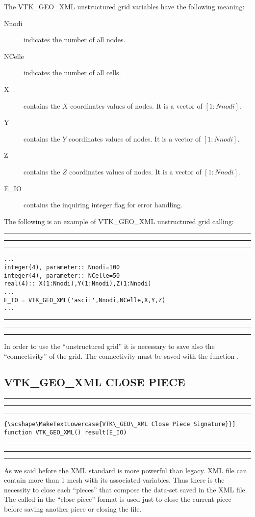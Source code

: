 \documentclass[pagesize=pdftex,fontsize=10pt,paper=a4,oneside]{scrbook}
\DeclareRobustCommand{\MarginNote}[1]{\marginpar{%
\slshape\footnotesize%
\parindent=0pt\lineskip=0pt\lineskiplimit=0pt%
\tolerance=2000\hyphenpenalty=300\exhyphenpenalty=300%
\doublehyphendemerits=100000\finalhyphendemerits=\doublehyphendemerits%
\raggedright\hspace{0pt}#1}}
\newenvironment{boxred}[1]%
               {%
                \noindent\hspace*{-0.025\textwidth}%
                \color{Maroon}%
                \rule[-5.8pt]{0.6pt}{6pt}\hspace*{-0.6pt}\rule{1.05\textwidth}{0.6pt}\hspace*{-0.6pt}\rule[-5.8pt]{0.6pt}{6pt}%
                \color{black}%
                \vspace*{0.6pt}\MarginNote{\color{Maroon}{#1}}%
               }%
               {%
                \noindent\hspace*{-0.025\textwidth}%
                \color{Maroon}%
                \rule[0pt]{0.6pt}{6pt}\hspace*{-0.6pt}\rule{1.05\textwidth}{0.6pt}\hspace*{-0.6pt}\rule[0pt]{0.6pt}{6pt}%
                \color{black}%
                \vspace*{2mm}%
               }
\newcommand{\virgo}[1]{``{#1}''}
\DeclareRobustCommand{\MaiuscolettoBS}[1]{\textls[80]{\scshape\MakeTextLowercase{#1}}}
\begin{document}
The VTK\_GEO\_XML unstructured grid variables have the following meaning:

\begin{description}
 \item[{\color{RoyalBlue}Nnodi}] indicates the number of all nodes.
 \item[{\color{RoyalBlue}NCelle}] indicates the number of all cells.
 \item[{\color{RoyalBlue}X}] contains the $X$ coordinates values of nodes. It is a vector of $[1:Nnodi]$.
 \item[{\color{RoyalBlue}Y}] contains the $Y$ coordinates values of nodes. It is a vector of $[1:Nnodi]$.
 \item[{\color{RoyalBlue}Z}] contains the $Z$ coordinates values of nodes. It is a vector of $[1:Nnodi]$.
 \item[{\color{RoyalBlue}E\_IO}] contains the inquiring integer flag for error handling.
\end{description}

The following is an example of VTK\_GEO\_XML unstructured grid calling:

\begin{boxred}{VTK\_GEO\_XML Unstructured Grid Calling}
\begin{verbatim}
...
integer(4), parameter:: Nnodi=100
integer(4), parameter:: NCelle=50
real(4):: X(1:Nnodi),Y(1:Nnodi),Z(1:Nnodi)
...
E_IO = VTK_GEO_XML('ascii',Nnodi,NCelle,X,Y,Z)
...
\end{verbatim}
\end{boxred}

In order to use the \virgo{unstructured grid} it is necessary to save also the \virgo{connectivity} of the grid.
The connectivity must be saved with the function \MaiuscolettoBS{VTK\_CON\_XML}.

\subsection{VTK\_GEO\_XML CLOSE PIECE}

\begin{boxred}{}
\begin{lstlisting}[style=signature,title=\color{Maroon}\MaiuscolettoBS{VTK\_GEO\_XML Close Piece Signature}]
function VTK_GEO_XML() result(E_IO)
\end{lstlisting}
\end{boxred}

As we said before the XML standard is more powerful than legacy. XML file can contain more than 1 mesh with its
associated variables. Thus there is the necessity to close each \virgo{pieces} that compose the data-set saved in the
XML file. The \MaiuscolettoBS{VTK\_GEO\_XML} called in the \virgo{close piece} format is used just to close the
current piece before saving another piece or closing the file.
\end{document}

